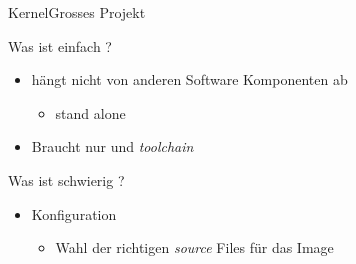\begin{frame}{Kernel}{Grosses Projekt}
\begin{block}{Was ist einfach ?}
 \begin{itemize}
  \item {} hängt nicht von anderen Software Komponenten ab
  \begin{itemize}
   \item stand alone
  \end{itemize}
  \item Braucht nur  und {\em toolchain}
 \end{itemize}
\end{block}
\begin{block}{Was ist schwierig ?}
 \begin{itemize}
  \item Konfiguration
  \begin{itemize}
   \item Wahl der richtigen {\em source} Files für das {\Large Image}
  \end{itemize}
 \end{itemize}
\end{block}
\end{frame}
